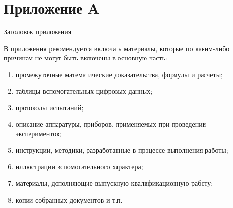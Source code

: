 \chapter*{Приложение A}

\begin{center}
	Заголовок приложения
\end{center}

В приложения рекомендуется включать материалы, которые по каким-либо причинам не могут быть включены в основную часть:
\begin{enumerate}
	\item промежуточные математические доказательства, формулы и расчеты;
	\item таблицы вспомогательных цифровых данных;
	\item протоколы испытаний;
	\item описание аппаратуры, приборов, применяемых при проведении экспериментов;
	\item инструкции, методики, разработанные в процессе выполнения работы;
	\item иллюстрации вспомогательного характера;
	\item материалы, дополняющие выпускную квалификационную работу;
	\item копии собранных документов и т.п.
\end{enumerate}